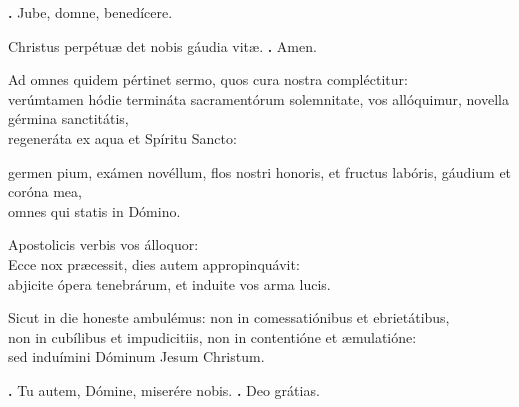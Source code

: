 \begin{small}
\textbf{\Vbar.} Jube, domne, benedícere.

Christus perpétuæ det nobis gáudia vitæ. \textbf{\Rbar.} Amen.
\end{small}


Ad omnes quidem pértinet sermo, quos cura nostra compléctitur: \\
verúmtamen hódie termináta sacramentórum solemnitate, vos allóquimur, novella gérmina sanctitátis, \\
regeneráta ex aqua et Spíritu Sancto: 

germen pium, exámen novéllum, flos nostri honoris, et fructus labóris, gáudium et coróna mea, \\
omnes qui statis in Dómino. 

Apostolicis verbis vos álloquor: \\
Ecce nox præcessit, dies autem appropinquávit: \\
abjicite ópera tenebrárum, et induite vos arma lucis. 

Sicut in die honeste ambulémus: non in comessatiónibus et ebrietátibus, \\
non in cubílibus et impudicitiis, non in contentióne et æmulatióne: \\
sed induímini Dóminum Jesum Christum.

\textbf{\Vbar.} Tu autem, Dómine, miserére nobis.
\textbf{\Rbar.} Deo grátias.

